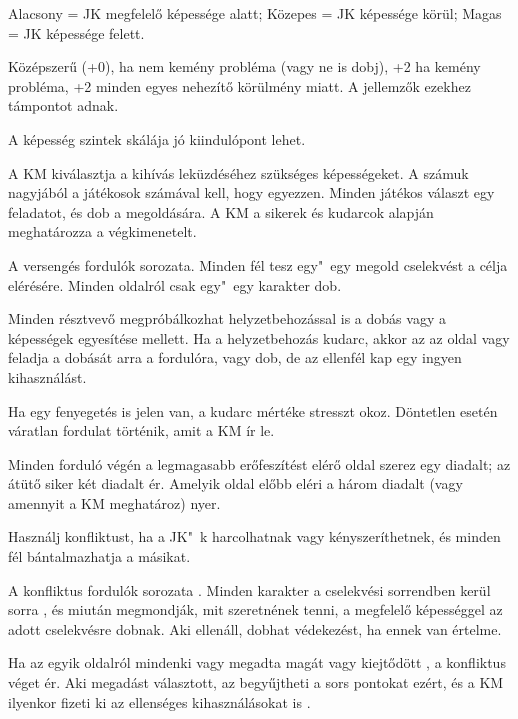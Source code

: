 \begin{multicols*}{2}

Alacsony = JK megfelelő képessége alatt; Közepes = JK képessége körül; Magas = JK képessége felett.

Középszerű (+0), ha nem kemény probléma (vagy ne is dobj), +2 ha kemény probléma, +2 minden egyes nehezítő körülmény miatt. A jellemzők ezekhez támpontot adnak.

A képesség szintek skálája jó kiindulópont lehet.

\columnbreak


A KM kiválasztja a kihívás leküzdéséhez szükséges képességeket. A számuk nagyjából a játékosok számával kell, hogy egyezzen. Minden játékos választ egy feladatot, és dob a megoldására. A KM a sikerek és kudarcok alapján meghatározza a végkimenetelt.


A versengés fordulók sorozata. Minden fél tesz egy"~egy megold cselekvést a célja elérésére. Minden oldalról csak egy"~egy karakter dob.

Minden résztvevő megpróbálkozhat helyzetbehozással is a dobás vagy a képességek egyesítése  mellett. Ha a helyzetbehozás kudarc, akkor az az oldal vagy feladja a dobását arra a fordulóra, vagy dob, de az ellenfél kap egy ingyen kihasználást.

Ha egy fenyegetés is jelen van, a kudarc mértéke stresszt okoz. Döntetlen esetén váratlan fordulat történik, amit a KM ír le.

Minden forduló végén a legmagasabb erőfeszítést elérő oldal szerez egy diadalt; az átütő siker két diadalt ér. Amelyik oldal előbb eléri a három diadalt (vagy amennyit a KM meghatároz) nyer.


Használj konfliktust, ha a JK"~k harcolhatnak vagy kényszeríthetnek, és minden fél bántalmazhatja a másikat.

A konfliktus fordulók sorozata . Minden karakter a cselekvési sorrendben kerül sorra , és miután megmondják, mit szeretnének tenni, a megfelelő képességgel az adott cselekvésre dobnak. Aki ellenáll, dobhat védekezést, ha ennek van értelme.

Ha az egyik oldalról mindenki vagy megadta magát  vagy kiejtődött , a konfliktus véget ér. Aki megadást választott, az begyűjtheti a sors pontokat ezért, és a KM ilyenkor fizeti ki az ellenséges kihasználásokat is .


\end{multicols*}
